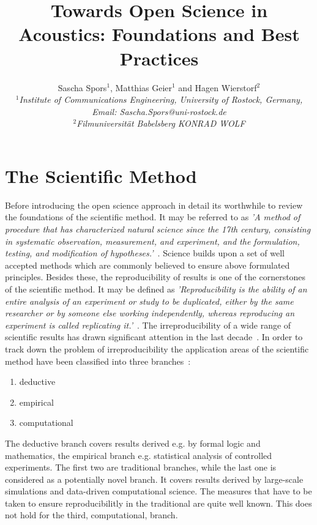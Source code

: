 \documentclass[a4paper, 10pt, twocolumn]{article}
\date{}                                         %
\title{\vspace{-8mm}\textbf{\large
Towards Open Science in Acoustics: Foundations and Best Practices}}
\author{
Sascha Spors$^1$, Matthias Geier$^1$ and Hagen Wierstorf$^2$\\
$^1$\emph{\small Institute of Communications Engineering, University of Rostock, Germany, Email: Sascha.Spors@uni-rostock.de}\\
$^2$\emph{\small Filmuniversität Babelsberg KONRAD WOLF}}
\begin{document}
\maketitle
\thispagestyle{empty}           %

\section*{The Scientific Method} \label{sec:intro} 

Before introducing the open science approach in detail its worthwhile to review the
foundations of the scientific method. It may be referred to  as 
\emph{'A method of procedure that has characterized natural science since the 17th 
century, consisting in systematic observation, measurement, and experiment, and the 
formulation, testing, and modification of hypotheses.'}~\cite{scientific_method:OXD}. 
Science builds upon a set of well accepted methods which are commonly believed to
ensure above formulated principles. Besides these, the reproducibility of results is 
one of the cornerstones of the scientific method. 
It may be defined as \emph{'Reproducibility is the ability of an entire analysis of 
an experiment or study to be duplicated, either by the same researcher or by someone 
else working independently, whereas reproducing an experiment is called replicating 
it.'}~\cite{Leek15:PNAS}. 
The irreproducibility of a wide range of scientific results has drawn significant 
attention in the last decade~\cite{Borgwardt:Book,retraction:WWW,ioannidis05:PLOS, open15:AAAS, chalmers09:OG, freedman15:PLOS, howells14:Nature}. 
In order to track down the problem of irreproducibility the application areas of 
the scientific method have been classified into three branches~\cite{Donoho:CSE,Stodden2014:talk}:
\begin{enumerate}
\item deductive
\item empirical
\item computational
\end{enumerate}
The deductive branch covers results derived e.g. by formal logic and mathematics, the empirical
branch e.g. statistical analysis of controlled experiments. The first two are traditional branches, 
while the last one is considered as a potentially novel branch. It covers results derived by large-scale simulations
and data-driven computational science. The measures that have to be taken to ensure reproducibilitly
in the traditional are quite well known. This does not hold for the third, computational, branch.
\end{document}

